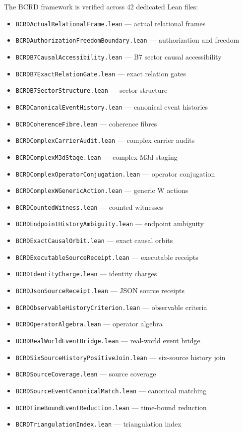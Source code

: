 \documentclass[11pt,a4paper]{article}
\theoremstyle{definition}
\theoremstyle{remark}
\begin{document}
The BCRD framework is verified across 42 dedicated Lean files:
\begin{itemize}[nosep]
\item \texttt{BCRDActualRelationalFrame.lean} --- actual relational frames
\item \texttt{BCRDAuthorizationFreedomBoundary.lean} --- authorization and freedom
\item \texttt{BCRDB7CausalAccessibility.lean} --- B7 sector causal accessibility
\item \texttt{BCRDB7ExactRelationGate.lean} --- exact relation gates
\item \texttt{BCRDB7SectorStructure.lean} --- sector structure
\item \texttt{BCRDCanonicalEventHistory.lean} --- canonical event histories
\item \texttt{BCRDCoherenceFibre.lean} --- coherence fibres
\item \texttt{BCRDComplexCarrierAudit.lean} --- complex carrier audits
\item \texttt{BCRDComplexM3dStage.lean} --- complex M3d staging
\item \texttt{BCRDComplexOperatorConjugation.lean} --- operator conjugation
\item \texttt{BCRDComplexWGenericAction.lean} --- generic W actions
\item \texttt{BCRDCountedWitness.lean} --- counted witnesses
\item \texttt{BCRDEndpointHistoryAmbiguity.lean} --- endpoint ambiguity
\item \texttt{BCRDExactCausalOrbit.lean} --- exact causal orbits
\item \texttt{BCRDExecutableSourceReceipt.lean} --- executable receipts
\item \texttt{BCRDIdentityCharge.lean} --- identity charges
\item \texttt{BCRDJsonSourceReceipt.lean} --- JSON source receipts
\item \texttt{BCRDObservableHistoryCriterion.lean} --- observable criteria
\item \texttt{BCRDOperatorAlgebra.lean} --- operator algebra
\item \texttt{BCRDRealWorldEventBridge.lean} --- real-world event bridge
\item \texttt{BCRDSixSourceHistoryPositiveJoin.lean} --- six-source history join
\item \texttt{BCRDSourceCoverage.lean} --- source coverage
\item \texttt{BCRDSourceEventCanonicalMatch.lean} --- canonical matching
\item \texttt{BCRDTimeBoundEventReduction.lean} --- time-bound reduction
\item \texttt{BCRDTriangulationIndex.lean} --- triangulation index
\end{itemize}
\end{document}
